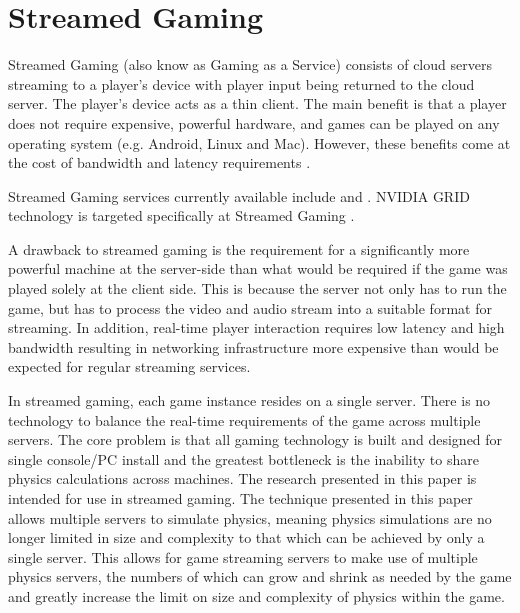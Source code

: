 \section{Streamed Gaming}

Streamed Gaming (also know as Gaming as a Service) consists of cloud servers streaming to a player's device with player input being returned to the cloud server. The player's device acts as a thin client. The main benefit is that a player does not require expensive, powerful hardware, and games can be played on any operating system (e.g. Android, Linux and Mac). However, these benefits come at the cost of bandwidth and latency requirements \cite{iCloudAccess}.

Streamed Gaming services currently available include \cite{NVidiaGameStream} and \cite{PSNOW}. NVIDIA GRID technology is targeted specifically at Streamed Gaming \cite{NVIDIACloud}.

A drawback to streamed gaming is the requirement for a significantly more powerful machine at the server-side than what would be required if the game was played solely at the client side. This is because the server not only has to run the game, but has to process the video and audio stream into a suitable format for streaming. In addition, real-time player interaction requires low latency and high bandwidth resulting in networking infrastructure more expensive than would be expected for regular streaming services. 

In streamed gaming, each game instance resides on a single server. There is no technology to balance the real-time requirements of the game across multiple servers. The core problem is that all gaming technology is built and designed for single console/PC install and the greatest bottleneck is the inability to share physics calculations across machines. The research presented in this paper is intended for use in streamed gaming. The technique presented in this paper allows multiple servers to simulate physics, meaning physics simulations are no longer limited in size and complexity to that which can be achieved by only a single server. This allows for game streaming servers to make use of multiple physics servers, the numbers of which can grow and shrink as needed by the game and greatly increase the limit on size and complexity of physics within the game.

